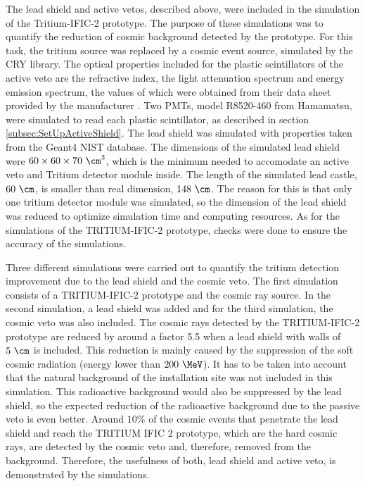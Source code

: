 The lead shield and active vetos, described above, were included in the simulation of the Tritium-IFIC-2 prototype. The purpose of these simulations was to quantify the reduction of cosmic background detected by the prototype. For this task, the tritium source was replaced by a cosmic event source, simulated by the CRY library. The optical properties included for the plastic scintillators of the active veto are the refractive index, the light attenuation spectrum and energy emission spectrum, the values of which were obtained from their data sheet provided by the manufacturer \cite{ScintillatorVeto}. Two PMTs, model R8520-460 from Hamamatsu, were simulated to read each plastic scintillator, as described in section \ref{subsec:SetUpActiveShield}. The lead shield was simulated with properties taken from the Geant4 NIST database. The dimensions of the simulated lead shield were $60 \times 60 \times 70~\cm^3$, which is the minimum needed to accomodate an active veto and Tritium detector module inside. The length of the simulated lead castle, $60~\cm$, is smaller than real dimension, $148~\cm$. The reason for this is that only one tritium detector module was simulated, so the dimension of the lead shield was reduced to optimize simulation time and computing resources. As for the simulations of the TRITIUM-IFIC-2 prototype, checks were done to ensure the accuracy of the simulations.

Three different simulations were carried out to quantify the tritium detection improvement due to the lead shield and the cosmic veto. The first simulation consists of a TRITIUM-IFIC-2 prototype and the cosmic ray source. In the second simulation, a lead shield was added and for the third simulation, the cosmic veto was also included. The cosmic rays detected by the TRITIUM-IFIC-2 prototype are reduced by around a factor 5.5 when a lead shield with walls of $5~\cm$ is included. This reduction is mainly caused by the suppression of the soft cosmic radiation (energy lower than $200~\MeV$). It has to be taken into account that the natural background of the installation site was not included in this simulation. This radioactive background would also be suppressed by the lead shield, so the expected reduction of the radioactive background due to the passive veto is even better. Around $10\%$ of the cosmic events that penetrate the lead shield and reach the TRITIUM IFIC 2 prototype, which are the hard cosmic rays, are detected by the cosmic veto and, therefore, removed from the background. Therefore, the usefulness of both, lead shield and active veto, is demonstrated by the simulations.